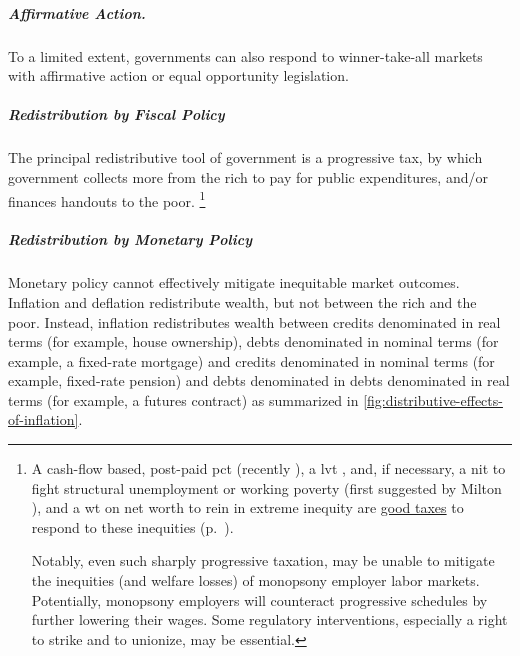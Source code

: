 \subparagraph{Affirmative Action.}
	\label{sec:affirmative-action}
To a limited extent, governments can also respond to winner-take-all markets with affirmative action or equal opportunity legislation.

\subparagraph{Redistribution by Fiscal Policy}
	\label{sec:fiscal-redistribution}
The principal redistributive tool of government is a progressive tax, by which government collects more from the rich to pay for public expenditures, and/or finances handouts to the poor.
\footnote{
	A cash-flow based, post-paid \gls{pct} (recently \citealt{McCaffery2002,McCaffery2005}), a \gls{lvt} \citep{George1879}, and, if necessary, a \gls{nit} to fight structural unemployment or working poverty (first suggested by Milton \citealt{Friedman1962}), and a \gls{wt} on net worth to rein in extreme inequity are \hyperref[chap:better-tax]{good taxes} to respond to these inequities (p.~\pageref{chap:better-tax}).

	Notably, even such sharply progressive taxation, may be unable to mitigate the inequities (and welfare losses) of monopsony employer labor markets.
	Potentially, monopsony employers will counteract progressive schedules by further lowering their wages.
	Some regulatory interventions, especially a right to strike and to unionize, may be essential.
}




\subparagraph{Redistribution by Monetary Policy}
	\label{sec:distributive-effects-of-inflation}
Monetary policy cannot effectively mitigate inequitable market outcomes.
Inflation and deflation redistribute wealth, but not between the rich and the poor.
Instead, inflation redistributes wealth between credits denominated in real terms (for example, house ownership), debts denominated in nominal terms (for example, a fixed-rate mortgage) and credits denominated in nominal terms (for example, fixed-rate pension) and debts denominated in debts denominated in real terms (for example, a futures contract) as summarized in \autoref{fig:distributive-effects-of-inflation}.

